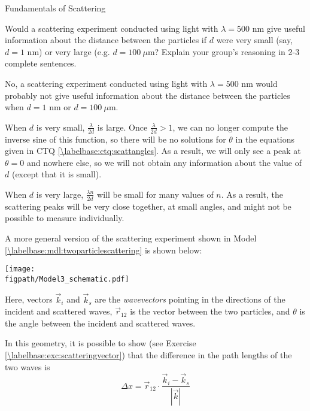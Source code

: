 \begin{activity}{Fundamentals of Scattering}
\begin{ctqs}
	\question Would a scattering experiment conducted using light with $\lambda=500\text{ nm}$ give useful information about the distance between the particles if $d$ were very small (say, $d=1\text{ nm}$) or very large (e.g. $d=100~\mu\text{m}$?  Explain your group's reasoning in 2-3 complete sentences.
	
		\begin{solution}[1.75in]{}
			No, a scattering experiment conducted using light with $\lambda=500\text{ nm}$ would probably not give useful information about the distance between the particles when $d=1\text{ nm}$ or $d=100~\mu\text{m}$.
			
			When $d$ is very small, $\frac{\lambda}{2d}$ is large.  Once $\frac{\lambda}{2d}>1$, we can no longer compute the inverse sine of this function, so there will be no solutions for $\theta$ in the equations given in CTQ \ref{\labelbase:ctq:scattangles}.  As a result, we will only see a peak at $\theta=0$ and nowhere else, so we will not obtain any information about the value of $d$ (except that it is small).
			
			When $d$ is very large, $\frac{\lambda n}{2d}$ will be small for many values of $n$.  As a result, the scattering peaks will be very close together, at small angles, and might not be possible to measure individually.
		\end{solution}
	
\end{ctqs}

\begin{model}
	\label{\labelbase:mdl:scatteringvector}
	
	A more general version of the scattering experiment shown in Model \ref{\labelbase:mdl:twoparticlescattering} is shown below:
	
	\centerline{\texttt{[image: \\figpath/Model3\_schematic.pdf]}}
	
	Here, vectors $\vec k_i$ and $\vec k_s$ are the \emph{wavevectors} pointing in the directions of the incident and scattered waves, $\vec r_{12}$ is the vector between the two particles, and $\theta$ is the angle between the incident and scattered waves.
	
	In this geometry, it is possible to show (see Exercise \ref{\labelbase:exc:scatteringvector}) that the difference in the path lengths of the two waves is
	\begin{equation*}
		\Delta x = \vec r_{12}\cdot \frac{\vec k_i - \vec k_s}{|\vec k|}
	\end{equation*}
	

\end{model}
\end{activity}
